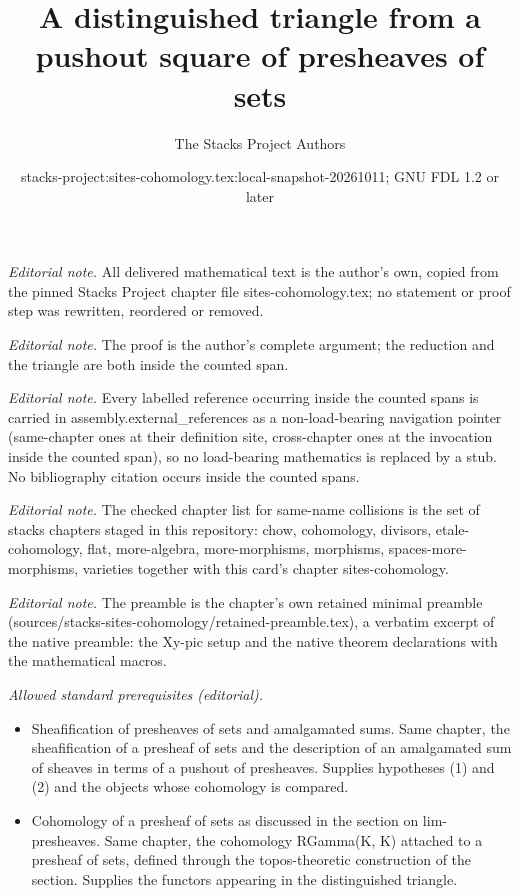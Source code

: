 \documentclass[10pt,a4paper]{amsart}
\title{A distinguished triangle from a pushout square of presheaves of sets}
\author{The Stacks Project Authors}
\date{stacks-project:sites-cohomology.tex:local-snapshot-20261011; GNU FDL 1.2 or later}
\theoremstyle{plain}
\theoremstyle{definition}
\theoremstyle{remark}
\numberwithin{equation}{subsection}
\begin{document}
\maketitle
\noindent\textit{Editorial note.} All delivered mathematical text is the author's own, copied from the pinned Stacks Project chapter file sites-cohomology.tex; no statement or proof step was rewritten, reordered or removed.\par\medskip
\noindent\textit{Editorial note.} The proof is the author's complete argument; the reduction and the triangle are both inside the counted span.\par\medskip
\noindent\textit{Editorial note.} Every labelled reference occurring inside the counted spans is carried in assembly.external\_references as a non-load-bearing navigation pointer (same-chapter ones at their definition site, cross-chapter ones at the invocation inside the counted span), so no load-bearing mathematics is replaced by a stub. No bibliography citation occurs inside the counted spans.\par\medskip
\noindent\textit{Editorial note.} The checked chapter list for same-name collisions is the set of stacks chapters staged in this repository: chow, cohomology, divisors, etale-cohomology, flat, more-algebra, more-morphisms, morphisms, spaces-more-morphisms, varieties together with this card's chapter sites-cohomology.\par\medskip
\noindent\textit{Editorial note.} The preamble is the chapter's own retained minimal preamble (sources/stacks-sites-cohomology/retained-preamble.tex), a verbatim excerpt of the native preamble: the Xy-pic setup and the native theorem declarations with the mathematical macros.\par\medskip
\noindent\textit{Allowed standard prerequisites (editorial).}\begin{itemize}
\item Sheafification of presheaves of sets and amalgamated sums. Same chapter, the sheafification of a presheaf of sets and the description of an amalgamated sum of sheaves in terms of a pushout of presheaves. Supplies hypotheses (1) and (2) and the objects whose cohomology is compared.
\item Cohomology of a presheaf of sets as discussed in the section on lim-presheaves. Same chapter, the cohomology RGamma(K, K) attached to a presheaf of sets, defined through the topos-theoretic construction of the section. Supplies the functors appearing in the distinguished triangle.
\end{itemize}\medskip
\end{document}
